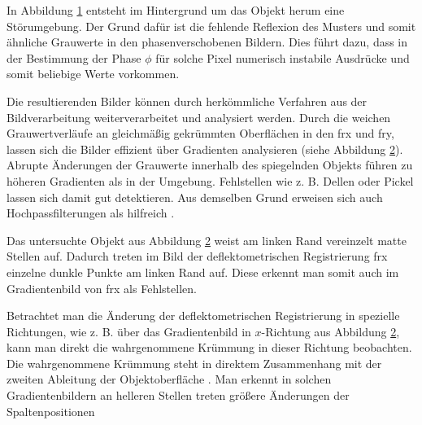 {
	\begin{figure}[H]
		\centering
		
		\label{tikz:abbRegistrierungDelle}
	\end{figure}
}

\noindent
In Abbildung \ref{tikz:abbRegistrierungDelle} entsteht im Hintergrund um das Objekt herum eine Störumgebung.
Der Grund dafür ist die fehlende Reflexion des Musters und somit ähnliche Grauwerte in den phasenverschobenen Bildern.
Dies führt dazu, dass in der Bestimmung der Phase $\phi$ für solche Pixel numerisch instabile Ausdrücke und somit beliebige Werte vorkommen.

\p
Die resultierenden Bilder können durch herkömmliche Verfahren aus der Bildverarbeitung weiterverarbeitet und analysiert werden.
Durch die weichen Grauwertverläufe an gleichmäßig gekrümmten Oberflächen in den \acrshort{frx} und \acrshort{fry}, lassen sich die Bilder effizient über Gradienten analysieren (siehe Abbildung \ref{tikz:abbGradientenbildReg}).
Abrupte Änderungen der Grauwerte innerhalb des spiegelnden Objekts führen zu höheren Gradienten als in der Umgebung. Fehlstellen wie z. B. Dellen oder Pickel lassen sich damit gut detektieren.
Aus demselben Grund erweisen sich auch Hochpassfilterungen als hilfreich \cite{kit_werling}.

{
	\begin{figure}[H]
		\centering
		
		\label{tikz:abbGradientenbildReg}
	\end{figure}
}

\noindent
Das untersuchte Objekt aus Abbildung \ref{tikz:abbGradientenbildReg} weist am linken Rand vereinzelt matte Stellen auf.
Dadurch treten im Bild der deflektometrischen Registrierung \acrshort{frx} einzelne dunkle Punkte am linken Rand auf.
Diese erkennt man somit auch im Gradientenbild von \acrshort{frx} als Fehlstellen.

\p
Betrachtet man die Änderung der deflektometrischen Registrierung in spezielle Richtungen, wie z. B. über das Gradientenbild in $x$-Richtung aus Abbildung \ref{tikz:abbGradientenbildReg}, kann man direkt die wahrgenommene Krümmung in dieser Richtung beobachten.
Die wahrgenommene Krümmung steht in direktem Zusammenhang mit der zweiten Ableitung der Objektoberfläche \cite{kit_werling}.
Man erkennt in solchen Gradientenbildern an helleren Stellen treten größere Änderungen der Spaltenpositionen 